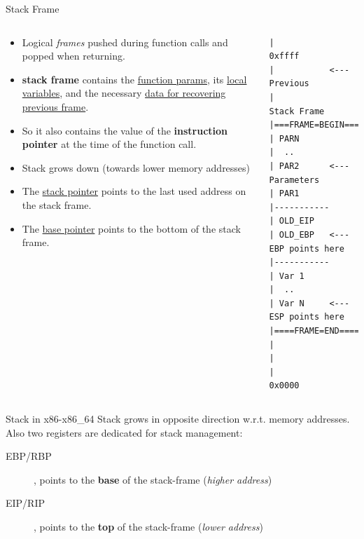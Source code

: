\begin{frame}{Stack Frame}

\begin{columns}[T]
	\begin{column}{.6\textwidth}
	\begin{itemize}
\item Logical \emph{frames} pushed during function calls and popped when returning. 
\item {\bf stack frame} contains the \underline{function params}, its \underline{local variables}, and the necessary \underline{data for recovering previous frame}.
\item So it also contains the value of the {\bf instruction pointer} at the time of the function call.
\item Stack grows down (towards lower memory addresses)
\item The \underline{stack pointer} points to the last used address on the stack frame.
\item The \underline{base pointer} points to the bottom of the stack frame.
\end{itemize}
	\end{column}
	\begin{column}{.3\textwidth}
	\tiny\begin{verbatim}
|                              0xffff
|           <--- Previous
|                Stack Frame
|===FRAME=BEGIN===
| PARN    
|  ..
| PAR2      <--- Parameters
| PAR1
|-----------
| OLD_EIP     
| OLD_EBP   <--- EBP points here
|-----------
| Var 1
|  ..
| Var N     <--- ESP points here 
|====FRAME=END====
|                             
|
|                             0x0000
	\end{verbatim}	
	
	
	\end{column}
\end{columns}



\framebreak

\begin{block}{Stack in x86-x86\_64}
Stack grows in opposite direction w.r.t. memory addresses.\\
Also two registers are dedicated for stack management:
\begin{description}
\item[EBP/RBP], points to the {\bf base} of the stack-frame (\emph{higher address})
\item[EIP/RIP], points to the {\bf top} of the stack-frame (\emph{lower address})
\end{description}
\end{block}


\end{frame}
